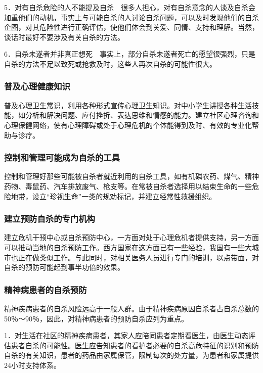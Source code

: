 5．对有自杀危险的人不能提及自杀　很多人担心，对有自杀意念的人谈及自杀会加重他们的动机，事实上与可能自杀的人讨论自杀问题，可以及时发现他们的自杀企图，对其危险性进行正确评估，使他们体会到关爱、同情、支持和理解。当然，谈话时最好不要涉及有关自杀的方法。

6．自杀未遂者并非真正想死　事实上，部分自杀未遂者死亡的愿望很强烈，只是自杀的方法不足以致死或抢救及时，这些人再次自杀的可能性很大。

\subsubsection{普及心理健康知识}

普及心理卫生常识，利用各种形式宣传心理卫生知识。对中小学生讲授各种生活技能，如分析和解决问题、应付挫折、表达思维和情感的能力。建立社区心理咨询和心理保健网络，使有心理障碍或处于心理危机的个体能得到及时、有效的专业化帮助与诊疗。

\subsubsection{控制和管理可能成为自杀的工具}

控制和管理好那些可能被自杀者就近利用的自杀工具，如有机磷农药、煤气、精神药物、毒鼠药、汽车排放废气、枪支等。在常被自杀者选择用以结束生命的一些危险地带，设立“珍视生命”一类的规劝标记，并建立经常性救援组织。

\subsubsection{建立预防自杀的专门机构}

建立危机干预中心或自杀预防中心，一方面对处于心理危机者提供支持，另一方面可以推动当地的自杀预防工作。西方国家在这方面已有一些经验，我国有一些大城市也正在做类似工作。与此同时，对相关医务人员进行专门的培训，以点带面，对自杀的预防可能起到事半功倍的效果。

\subsubsection{精神病患者的自杀预防}

精神疾病患者的自杀风险远高于一般人群。由于精神疾病原因自杀者占自杀总数的50％～90％，因此，对精神病患者的预防自杀应列为重点。

1．对生活在社区的精神疾病患者，其家人应陪同患者定期看医生，由医生动态评估患者自杀的可能性。医生应告知患者的看护者必要的自杀高危特征的识别和预防自杀的有关知识，患者的药品由家属保管，限制每次的处方量，为患者和家属提供24小时支持体系。

